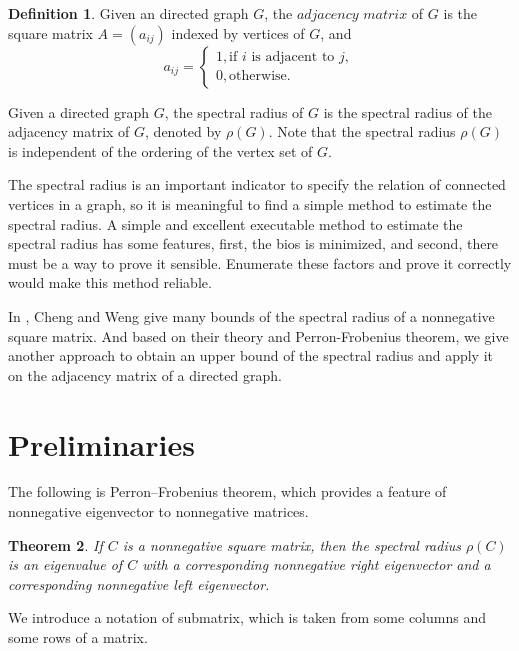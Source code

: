 \documentclass[12pt, a4paper]{article}
\theoremstyle{plain}
\newtheorem{thm}{Theorem}[section]
\theoremstyle{definition}
\newtheorem{defn}[thm]{Definition}
\begin{document}
\begin{defn}
    Given an directed graph $G$, the $\textit{adjacency matrix}$ of $G$ is the square
    matrix $A = (a_{ij})$ indexed by vertices of $G$, and
     \[a_{ij} =\begin{cases}
        1, \text{if $i$ is adjacent to $j$}, \\
        0, \text{otherwise.}
            \end{cases}
     \]
\end{defn}

Given a directed graph $G$, the spectral radius of $G$ is the spectral radius of the adjacency matrix of $G$, denoted by $\rho(G)$. Note that the spectral radius $\rho(G)$ is independent of the ordering of the vertex set of $G$.

The spectral radius is an important indicator to specify the relation of connected vertices in a graph, so it is meaningful to find a simple method to estimate the spectral radius. A simple and excellent executable method to estimate the spectral radius has some features, first, the bios is minimized, and second, there must be a way to prove it sensible. Enumerate these factors and prove it correctly would make this method reliable.

In \cite{chang}, Cheng and Weng give many bounds of the spectral radius of a nonnegative square matrix. And based on their theory and Perron-Frobenius theorem, we give another approach to obtain an upper bound of the spectral radius and apply it on the adjacency matrix of a directed graph.

\section{Preliminaries}

The following is Perron–Frobenius theorem, which provides a feature of
 nonnegative eigenvector to nonnegative matrices.

\begin{thm} \cite{prn_fros2} \label{thm:Perron_Frobenius}
    If $C$ is a nonnegative square matrix, then the spectral radius $\rho(C)$ is an
    eigenvalue of $C$ with a corresponding nonnegative right eigenvector and a
    corresponding nonnegative left eigenvector.
\end{thm}

We introduce a notation of submatrix, which is taken from some columns and some rows of a matrix.
\end{document}
